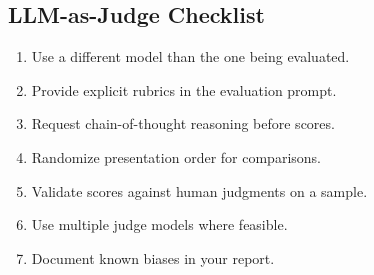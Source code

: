 \subsection{LLM-as-Judge Checklist}
\label{app:judge_checklist}
\begin{enumerate}
    \item Use a different model than the one being evaluated.
    \item Provide explicit rubrics in the evaluation prompt.
    \item Request chain-of-thought reasoning before scores.
    \item Randomize presentation order for comparisons.
    \item Validate scores against human judgments on a sample.
    \item Use multiple judge models where feasible.
    \item Document known biases in your report.
\end{enumerate}

